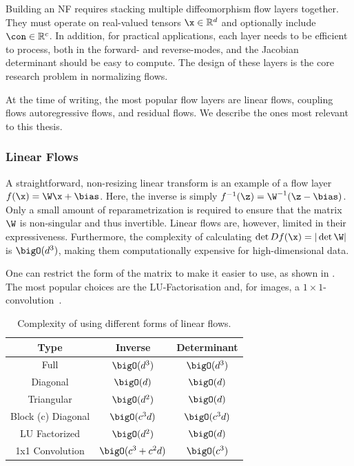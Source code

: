 Building an NF requires stacking multiple diffeomorphism flow layers together.
They must operate on real-valued tensors $\x \in \mathbb{R}^d$ and optionally include $\con \in \mathbb{R}^c$.
In addition, for practical applications, each layer needs to be efficient to process, both in the forward- and reverse-modes, and the Jacobian determinant should be easy to compute.
The design of these layers is the core research problem in normalizing flows.

At the time of writing, the most popular flow layers are linear flows, coupling flows autoregressive flows, and residual flows.
We describe the ones most relevant to this thesis.

\subsubsection{Linear Flows}

A straightforward, non-resizing linear transform is an example of a flow layer $f(\x) = \W\x + \bias$.
Here, the inverse is simply $f^{-1}(\z) = \W^{-1}(\z - \bias)$.
Only a small amount of reparametrization is required to ensure that the matrix $\W$ is non-singular and thus invertible.
Linear flows are, however, limited in their expressiveness.
Furthermore, the complexity of calculating $\det D f(\x) = |\det \W|$ is $\bigO(d^3)$, making them computationally expensive for high-dimensional data.

One can restrict the form of the matrix to make it easier to use, as shown in .
The most popular choices are the LU-Factorisation and, for images, a $1\times1$-convolution~\cite{GlowGenerativeFlow}.

\begin{table}[h!]
    \centering
    \caption{Complexity of using different forms of linear flows.}
    \label{tab:linear_flows}
    \begin{tabular}{ccc}
    \toprule
    \textbf{Type} & \textbf{Inverse} & \textbf{Determinant} \\
    \midrule
    Full & $\bigO(d^3)$ & $\bigO(d^3)$ \\
    Diagonal & $\bigO(d)$ & $\bigO(d)$ \\
    Triangular & $\bigO(d^2)$ & $\bigO(d)$ \\
    Block (c) Diagonal & $\bigO(c^3d)$ & $\bigO(c^3d)$ \\
    LU Factorized & $\bigO(d^2)$ & $\bigO(d)$ \\
    1x1 Convolution & $\bigO(c^3 + c^2d)$ & $\bigO(c^3)$ \\
    \bottomrule
    \end{tabular}
\end{table}

